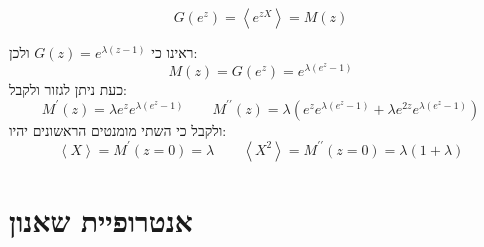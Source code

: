\documentclass{tstextbook}
\begin{document}
\begin{corollary}
$$G\left(e^{z}\right)=\left\langle e^{z X}\right\rangle=M\left(z\right)$$

\end{corollary}
\begin{example}
ראינו כי \({G}\left(z\right)=e^{\lambda(z-1)}\) ולכן:
$$M\left(z\right)=G\left(e^{z}\right)=e^{\lambda\left(e^{z}\!-\!1\right)}$$
כעת ניתן לגזור ולקבל:
$$M^{\prime}\left(z\right)=\lambda e^{z}e^{\lambda\left(e^{z}\!-\!1\right)}\qquad M^{\prime\prime}\left(z\right)=\lambda\left(e^{z}e^{\lambda\left(e^{z}-1\right)}+\lambda e^{2z}e^{\lambda\left(e^{z}-1\right)}\right)$$
ולקבל כי השתי מומנטים הראשונים יהיו:
$$\left\langle X\right\rangle=M^{\prime}\left(z=0\right)=\lambda \qquad \left\langle X^{2}\right\rangle=M^{\prime\prime}\left(z=0\right)=\lambda\left(1+\lambda\right)$$

\end{example}
\section{אנטרופיית שאנון}
\end{document}
